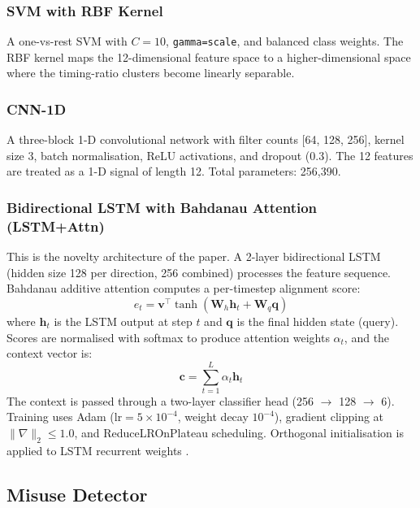\documentclass[conference]{IEEEtran}
\begin{document}
\subsubsection{SVM with RBF Kernel}
A one-vs-rest SVM with $C=10$, \texttt{gamma=scale}, and balanced
class weights.
The RBF kernel maps the 12-dimensional feature space to a
higher-dimensional space where the timing-ratio clusters become
linearly separable.

\subsubsection{CNN-1D}
A three-block 1-D convolutional network with filter counts
[64, 128, 256], kernel size 3, batch normalisation, ReLU activations,
and dropout (0.3).
The 12 features are treated as a 1-D signal of length 12.
Total parameters: 256{,}390.

\subsubsection{Bidirectional LSTM with Bahdanau Attention (LSTM+Attn)}
This is the novelty architecture of the paper.
A 2-layer bidirectional LSTM (hidden size 128 per direction,
256 combined) processes the feature sequence.
Bahdanau additive attention \cite{bahdanau2015neural} computes a
per-timestep alignment score:
\begin{equation}
  e_t = \mathbf{v}^\top \tanh\!\left(\mathbf{W}_h \mathbf{h}_t
        + \mathbf{W}_q \mathbf{q}\right)
  \label{eq:attention}
\end{equation}
where $\mathbf{h}_t$ is the LSTM output at step $t$ and $\mathbf{q}$
is the final hidden state (query).
Scores are normalised with softmax to produce attention weights
$\alpha_t$, and the context vector is:
\begin{equation}
  \mathbf{c} = \sum_{t=1}^{L} \alpha_t \mathbf{h}_t
  \label{eq:context}
\end{equation}
The context is passed through a two-layer classifier head
(256 $\to$ 128 $\to$ 6).
Training uses Adam ($\text{lr}=5\times10^{-4}$, weight decay $10^{-4}$),
gradient clipping at $\|\nabla\|_2 \leq 1.0$, and
ReduceLROnPlateau scheduling.
Orthogonal initialisation is applied to LSTM recurrent weights
\cite{saxe2013exact}.

\subsection{Misuse Detector}
\end{document}
